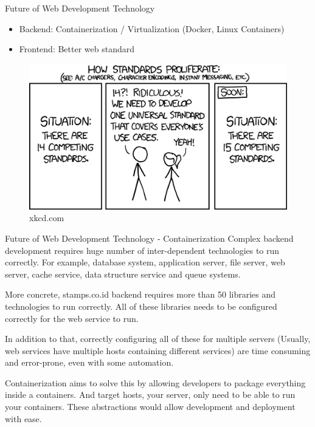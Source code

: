 \documentclass{beamer}
\begin{document}
  
   \begin{frame}{Future of Web Development Technology}
   	\pause
	\begin{itemize}[<+->]
		\item Backend: Containerization / Virtualization (Docker, Linux Containers)
		\item Frontend: Better web standard \footnotemark[1] \footnotemark[2] 
	\end{itemize}
	\pause
	\begin{center}
		\begin{figure}
		\includegraphics[scale=0.485]{images/standards.png}
		\caption{xkcd.com}
		\end{figure}
	\end{center}

  \end{frame}
  
  \begin{frame}{Future of Web Development Technology - Containerization}
	Complex backend development requires huge number of inter-dependent technologies to run correctly. For example, database system, application server, file server, web server, cache service, data structure service and queue systems. 
	
	More concrete, stamps.co.id backend requires more than 50 libraries and technologies to run correctly. All of these libraries needs to be configured correctly for the web service to run. 
	
	In addition to that, correctly configuring all of these for multiple servers (Usually, web services have multiple hosts containing different services) are time consuming and error-prone, even with some automation.
	
	Containerization aims to solve this by allowing developers to package everything inside a containers. And target hosts, your server, only need to be able to run your containers. These abstractions would allow development and deployment with ease.
	
  \end{frame}
  
\end{document}
